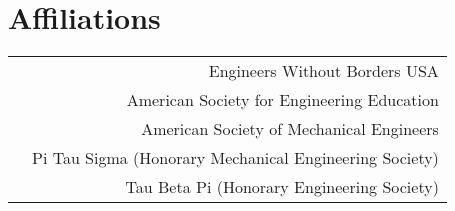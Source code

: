 \section*{Affiliations}
\begin{tabular}{L!{\VRule}R}
&Engineers Without Borders USA\\
&American Society for Engineering Education\\
&American Society of Mechanical Engineers\\
&Pi Tau Sigma (Honorary Mechanical Engineering Society)\\
&Tau Beta Pi (Honorary Engineering Society)\\
\end{tabular}